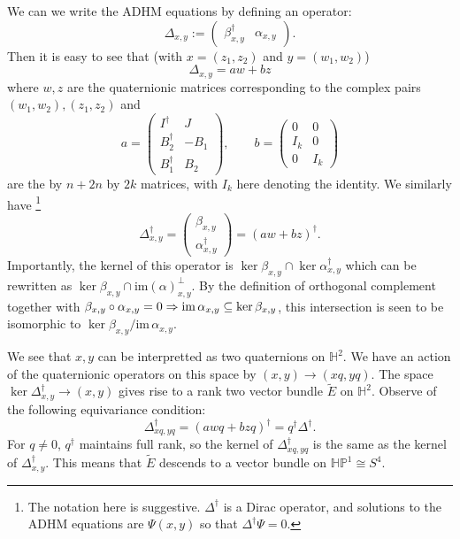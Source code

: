 	We can we write the ADHM equations by defining an operator:
	\begin{equation}
		\Delta_{x,y} := \begin{pmatrix}
			\beta^\dagger_{x,y} & \alpha_{x,y}
		\end{pmatrix}.
	\end{equation}
	Then it is easy to see that (with $x=(z_1, z_2)$ and $y=(w_1, w_2)$)
	\begin{equation}
		\Delta_{x, y} = a w + b z
	\end{equation}
	where $w, z$ are the quaternionic matrices corresponding to the complex pairs $(w_1, w_2), (z_1, z_2)$ and 
	\begin{equation}
		a = \begin{pmatrix}
			I^\dagger & J\\
			B_2^\dagger & -B_1\\
			B_1^\dagger & B_2
		\end{pmatrix}, \qquad b = \begin{pmatrix}
			0 & 0\\
			I_k & 0\\
			0 & I_k
		\end{pmatrix}
	\end{equation}
	are the by $n+ 2n$ by $2k$ matrices, with $I_k$ here denoting the identity. We similarly have \footnote{The notation here is suggestive. $\Delta^\dagger$ is a Dirac operator, and solutions to the ADHM equations are $\Psi(x,y)$ so that $\Delta^\dagger \Psi = 0$.}
	\begin{equation}
		\Delta^\dagger_{x,y} = \begin{pmatrix}
			\beta_{x,y}\\
			\alpha^\dagger_{x,y}
		\end{pmatrix} =
		(a w  + b z)^\dagger.
	\end{equation}
	Importantly, the kernel of this operator is $\ker \beta_{x,y} \cap \ker \alpha^\dagger_{x,y}$ which can be rewritten as $\ker \beta_{x,y} \cap \mathrm{im}(\alpha)^\perp_{x,y}$. By the definition of orthogonal complement together with $\beta_{x,y} \circ \alpha_{x,y} = 0 \Rightarrow \mathrm{im}\, \alpha_{x,y} \subseteq \ker \beta_{x,y}$, this intersection is seen to be isomorphic to $\ker \beta_{x,y} / \mathrm{im}\, \alpha_{x,y}$.
	
	We see that $x, y$ can be interpretted as two quaternions on $\mathbb H^2$. We have an action of the quaternionic operators on this space by $(x, y) \to (x q, y q)$. The space $\ker \Delta^\dagger_{x, y} \to (x, y)$ gives rise to a rank two vector bundle $\tilde E$ on $\mathbb H^2$. Observe of the following equivariance condition:
	\begin{equation}
		\Delta^\dagger_{xq, yq} = (a w q + b z q)^\dagger = q^\dagger \Delta^\dagger.
	\end{equation}
	For $q \neq 0$, $q^\dagger$ maintains full rank, so the kernel of $\Delta^\dagger_{xq, yq}$ is the same as the kernel of $\Delta^\dagger_{x,y}$. This means that $\tilde E$ descends to a vector bundle on $\mathbb{HP}^1 \cong S^4$.




